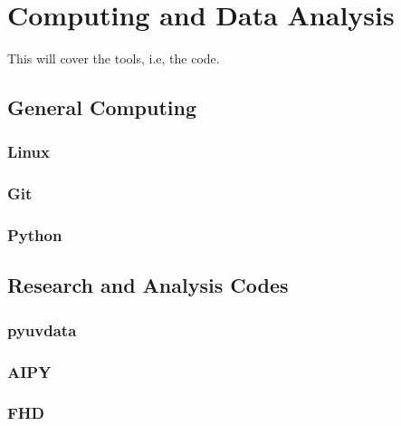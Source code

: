 \chapter{Computing and Data Analysis}
\label{ch3}

This will cover the tools, i.e, the code.

\section{General Computing}

\subsection{Linux}

\subsection{Git}

\subsection{Python}

\section{Research and Analysis Codes}

\subsection{pyuvdata}

\subsection{AIPY}

\subsection{FHD}
